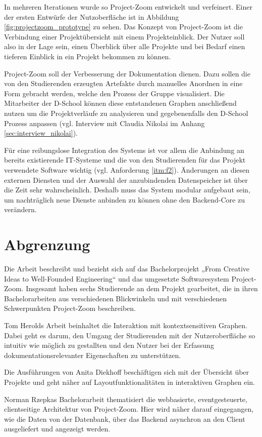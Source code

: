 In mehreren Iterationen wurde so Project-Zoom entwickelt und verfeinert. Einer der ersten Entwürfe der Nutzoberfläche ist in Abbildung \ref{fig:projectzoom_prototype} zu sehen. Das Konzept von Project-Zoom ist die Verbindung einer Projektübersicht mit einem Projekteinblick. Der Nutzer soll also in der Lage sein, einen Überblick über alle Projekte und bei Bedarf einen tieferen Einblick in ein Projekt bekommen zu können.

Project-Zoom soll der Verbesserung der Dokumentation dienen. Dazu sollen die von den Studierenden erzeugten Artefakte durch manuelles Anordnen in eine Form gebracht werden, welche den Prozess der Gruppe visualisiert. Die Mitarbeiter der D-School können diese entstandenen Graphen anschließend nutzen um die Projektverläufe zu analysieren und gegebenenfalls den D-School Prozess anpassen (vgl. Interview mit Claudia Nikolai im Anhang \ref{sec:interview_nikolai}).

Für eine reibungslose Integration des Systems ist vor allem die Anbindung an bereits existierende IT-Systeme  und die von den Studierenden für das Projekt verwendete Software wichtig (vgl. Anforderung \ref{itm:f2}). Änderungen an diesen externen Diensten und der Auswahl der anzubindenden Datenspeicher ist über die Zeit sehr wahrscheinlich. Deshalb muss das System modular aufgebaut sein, um nachträglich neue Dienste anbinden zu können ohne den Backend-Core zu verändern.

\section{Abgrenzung}
Die Arbeit beschreibt und bezieht sich auf das Bachelorprojekt „From Creative Ideas to Well-Founded Engineering“ und das umgesetzte Softwaresystem Project-Zoom. Insgesamt haben sechs Studierende an dem Projekt gearbeitet, die in ihren Bachelorarbeiten aus verschiedenen Blickwinkeln und mit verschiedenen Schwerpunkten Project-Zoom beschreiben.

Tom Herolds Arbeit \cite{bp-tomh} beinhaltet die Interaktion mit kontextsensitiven Graphen. Dabei geht es darum, den Umgang der Studierenden mit der Nutzeroberfläche so intuitiv wie möglich zu gestallten und den Nutzer bei der Erfassung dokumentationsrelevanter Eigenschaften zu unterstützen.

Die Ausführungen von Anita Diekhoff \cite{bp-anita}  beschäftigen sich mit der Übersicht über Projekte und geht näher auf Layoutfunktionalitäten in interaktiven Graphen ein.

Norman Rzepkas Bachelorarbeit \cite{bp-norman} thematisiert die webbasierte, eventgesteuerte, clientseitige Architektur von Project-Zoom. Hier wird näher darauf eingegangen, wie die Daten von der Datenbank, über das Backend asynchron an den Client ausgeliefert und angezeigt werden.

